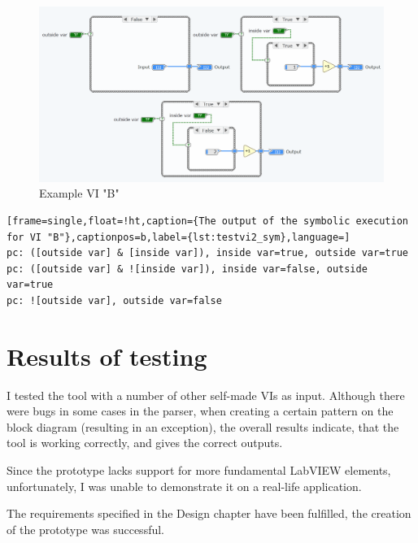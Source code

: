 \begin{figure}
\centering
\includegraphics[width=150mm,keepaspectratio]{figures/testvi2.png}
\caption{Example VI "B"} 
\label{fig:testvi2}
\end{figure}


\begin{lstlisting}[frame=single,float=!ht,caption={The output of the symbolic execution for VI "B"},captionpos=b,label={lst:testvi2_sym},language=]
pc: ([outside var] & [inside var]), inside var=true, outside var=true
pc: ([outside var] & ![inside var]), inside var=false, outside var=true
pc: ![outside var], outside var=false
\end{lstlisting}

\section{Results of testing}
I tested the tool with a number of other self-made VIs as input. Although there were bugs in some cases in the parser, when creating a certain pattern on the block diagram (resulting in an exception), the overall results indicate, that the tool is working correctly, and gives the correct outputs.

Since the prototype lacks support for more fundamental LabVIEW elements, unfortunately, I was unable to demonstrate it on a real-life application.

The requirements specified in the Design chapter have been fulfilled, the creation of the prototype was successful.
